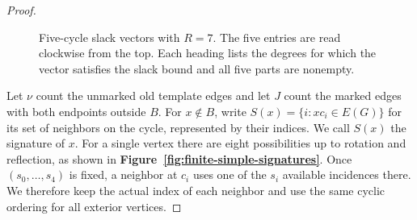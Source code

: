 \documentclass[preprint,11pt,numbers]{elsarticle-arxiv}
\numberwithin{equation}{section}
\theoremstyle{definition}
\begin{document}
\begin{proof}
\begin{figure}[htbp]
\caption{Five-cycle slack vectors with $R=7$. The five entries are read clockwise from the top. Each heading lists the degrees for which the vector satisfies the slack bound and all five parts are nonempty.}
\label{fig:finite-simple-slack-seven}
\end{figure}

Let $\nu$ count the unmarked old template edges and let $J$ count the
marked edges with both endpoints outside $B$. For $x\notin B$, write
$S(x)=\{i:xc_i\in E(G)\}$ for its set of neighbors on the cycle,
represented by their indices. We call $S(x)$ the signature of $x$.
For a single vertex there are eight possibilities up to rotation and
reflection, as shown in \textbf{Figure~\ref{fig:finite-simple-signatures}}.
Once $(s_0,\ldots,s_4)$ is fixed, a neighbor at $c_i$ uses one of the
$s_i$ available incidences there. We therefore keep the actual index of
each neighbor and use the same cyclic ordering for all exterior vertices.


\end{proof}
\end{document}

